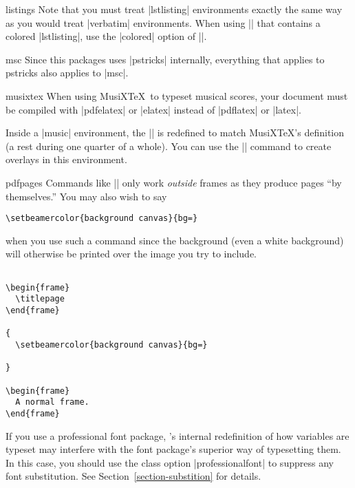 \begin{package}{{listings}}
  \beamernote
  Note that you must treat |lstlisting| environments exactly the same
  way as you would treat |verbatim| environments. When using
  || that contains a colored |lstlisting|, use the
  |colored| option of ||.
\end{package}

\begin{package}{{msc}}
  \beamernote
  Since this packages uses |pstricks| internally, everything that
  applies to pstricks also applies to |msc|.
\end{package}

\begin{package}{{musixtex}}
  When using  MusiX\TeX\ to typeset musical scores, your document must
  be compiled with |pdfelatex| or |elatex| instead of |pdflatex| or
  |latex|.  

  Inside  a |music| environment, the |\pause| is redefined to match
  MusiX\TeX's definition (a rest during one quarter of a whole). You can
  use the |\beamerpause| command  to create overlays in this
  environment.  
\end{package}

\begin{package}{{pdfpages}}
  Commands like || only work \emph{outside} frames as they
  produce pages ``by themselves.'' You may also wish to say
\begin{verbatim}
\setbeamercolor{background canvas}{bg=} 
\end{verbatim}
  when you use such a command since the background (even a white
  background) will otherwise be printed over the image you try to include.

  \example
\begin{verbatim}

\begin{frame}
  \titlepage
\end{frame}

{
  \setbeamercolor{background canvas}{bg=} 
  
}

\begin{frame}
  A normal frame.
\end{frame}

\end{verbatim}
\end{package}

\begin{package}{{\normalfont{}}}
  \beamernote
  If you use a professional font package, \beamer's internal
  redefinition of how variables are typeset may interfere with the
  font package's superior way of typesetting them. In this case, you
  should use the class option |professionalfont| to suppress any font
  substitution. See Section~\ref{section-substition} for details.
\end{package}

